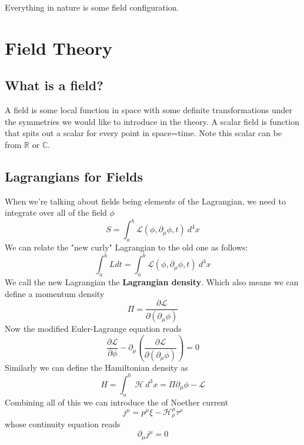\begin{savequote}[45mm]
Everything in nature is some field configuration.
\end{savequote}
\chapter{Field Theory}
\section{What is a field?}
 A field is some local function in space with some definite transformations under the symmetries we would like to introduce in the theory. A scalar field is function that spits out a scalar for every point in space=time. Note this scalar can be from $\mathbb{R}$ or $\mathbb{C}$.
\section{Lagrangians for Fields}
When we're talking about fields being elements of the Lagrangian, we need to integrate over all of the field $\phi$
\begin{equation}
    S = \int_{a}^{b} \mathcal{L}(\phi, \partial_{\mu} \phi, t) \ d^{4}x
\end{equation}
We can relate the "new curly" Lagrangian to the old one as follows:
\begin{equation}
   \int_{a}^{b} L dt = \int_{a}^{b} \mathcal{L}(\phi, \partial_{\mu} \phi, t) \ d^{3}x
\end{equation}
We call the new Lagrangian the \textbf{Lagrangian density}. Which also means we can define a momentum density
\begin{equation}
    \Pi = \frac{\partial \mathcal{L}}{\partial(\partial_{\mu} \phi)}
\end{equation}
Now the modified Euler-Lagrange equation reads
\begin{equation}
     \frac{\partial \mathcal{L}}{\partial \phi} - \partial_{\mu} \left( \frac{\partial \mathcal{L}}{\partial(\partial_{\mu} \phi)} \right) = 0
\end{equation}
Similarly we can define the Hamiltonian density as
\begin{equation}
    H = \int_{a}^{b} \ \mathcal{H} \ d^{3}x = \Pi \partial_{\mu} \phi - \mathcal{L}
\end{equation}
Combining all of this we can introduce the of Noether current
\begin{equation}
    j^{\mu} = p^{\mu}\xi - \mathcal{H}^{\mu}_{\rho}\tau^{\rho}
\end{equation}
whose continuity equation reads
\begin{equation}
    \partial_{\mu} j^{\mu} = 0
\end{equation}
